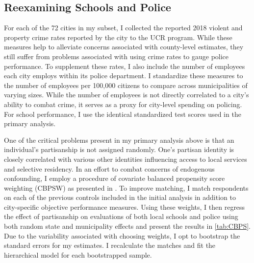 \subsection{Reexamining Schools and Police}

For each of the 72 cities in my subset, I collected the reported 2018 violent and property crime rates reported by the city to the UCR program. While these measures help to alleviate concerns associated with county-level estimates, they still suffer from problems associated with using crime rates to gauge police performance. To supplement these rates, I also include the number of employees each city employs within its police department. I standardize these measures to the number of employees per 100,000 citizens to compare across municipalities of varying sizes. While the number of employees is not directly correlated to a city's ability to combat crime, it serves as a proxy for city-level spending on policing. For school performance, I use the identical standardized test scores used in the primary analysis.


 One of the critical problems present in my primary analysis above is that an individual's partisanship is not assigned randomly. One's partisan identity is closely correlated with various other identities influencing access to local services and selective residency. In an effort to combat concerns of endogenous confounding, I employ a procedure of covariate balanced propensity score weighting (CBPSW) as presented in \citet{imaiCovariateBalancingPropensity2014}. To improve matching, I match respondents on each of the previous controls included in the initial analysis in addition to city-specific objective performance measures. Using these weights, I then regress the effect of partisanship on evaluations of both local schools and police using both random state and municipality effects and present the results in \autoref{tab:CBPS}. Due to the variability associated with choosing weights, I opt to bootstrap the standard errors for my estimates. I recalculate the matches and fit the hierarchical model for each bootstrapped sample.


